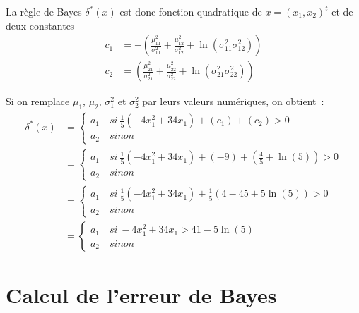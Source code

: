 \documentclass[a4paper,10pt]{report}
\begin{document}
La règle de Bayes $\delta^*(x)$ est donc fonction quadratique de $x = (x_1, x_2)^t$ et de deux constantes
\begin{align*}
c_1 &= - \left(  
\frac{\mu_{11}^2}{\sigma_{11}^2} 
+ \frac{\mu_{12}^2}{\sigma_{12}^2} 
+ \ln(\sigma_{11}^2 \sigma_{12}^2)
\right) \\
c_2 &= \left(  
\frac{\mu_{21}^2}{\sigma_{21}^2} 
+ \frac{\mu_{22}^2}{\sigma_{22}^2} 
+ \ln(\sigma_{21}^2 \sigma_{22}^2) 
\right)
\end{align*}


Si on remplace $\mu_{1}$, $\mu_{2}$, $\sigma_{1}^2$ et $\sigma_{2}^2$ par leurs valeurs numériques, on obtient~:
\begin{align*}
\delta^*(x) 
&=  \left\{ 
\begin{array}{l}
a_1 \quad si\ \frac{1}{5}(-4x_1^2 + 34x_1) + \left(c_1\right) + \left(c_2\right) > 0 \\
a_2 \quad sinon
\end{array} 	\right. \\
&=  \left\{ 
\begin{array}{l}
a_1 \quad si\ \frac{1}{5}(-4x_1^2 + 34x_1) + \left(-9\right) + \left(\frac{4}{5} + \ln(5)\right) > 0 \\
a_2 \quad sinon
\end{array} 	\right. \\
&=  \left\{ 
\begin{array}{l}
a_1 \quad si\ \frac{1}{5}(-4x_1^2 + 34x_1) + \frac{1}{5} \left( 4 - 45 + 5\ln(5) \right) > 0 \\
a_2 \quad sinon
\end{array} 	\right. \\
&=  \left\{ 
\begin{array}{l}
a_1 \quad si\ -4x_1^2 + 34x_1 > 41 - 5\ln(5) \\
a_2 \quad sinon
\end{array} 	\right.
\end{align*}


\section{Calcul de l'erreur de Bayes}
\end{document}
